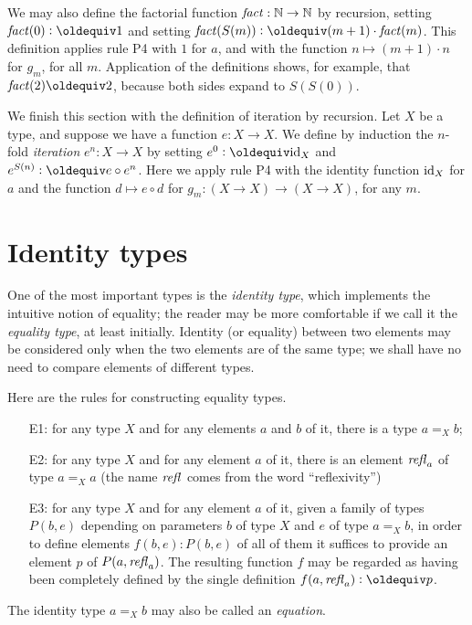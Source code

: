 We may also define the factorial function $\mathop{\mathit{fact}} : \mathbb{N} \to \mathbb{N}$ by recursion, setting $\fact(0) \defeq 1$ and setting
$\fact(S(m)) \defeq (m+1) \cdot \fact(m)$.  This definition applies rule P4 with $1$ for $a$, and with the
function $n \mapsto (m+1) \cdot n$ for $g_m$, for all $m$.
Application of the definitions shows, for example, that $\fact(2) \jdeq 2$, because both sides expand to $S(S(0))$.

We finish this section with the definition of iteration by recursion.  Let $X$ be a type, and suppose we have a function $e : X \to X$.  We
define by induction the $n$-fold \emph{iteration} $e^n : X \to X$ by setting $e^0 \defeq \id_X$ and $e^{S(n)}\defeq e\circ e^n$.
Here we apply rule P4 with the identity function $\mathord{\mathrm{id}}_X$ for $a$
and the function $d \mapsto e\circ d$ for $g_m : (X\to X)\to(X\to X)$, for any $m$.

\section{Identity types}
\label{sec:identity-types}

One of the most important types is the \emph{identity type}, which implements the intuitive notion of equality; the reader may be more
comfortable if we call it the \emph{equality type}, at least initially.  Identity (or equality) between two elements may be considered only when
the two elements are of the same type; we shall have no need to compare elements of different types.

Here are the rules for constructing equality types.
\begin{enumerate}
\item[E1:]
  for any type $X$ and for any elements $a$ and $b$ of it, there is a type $a =_X b$;
\item[E2:] for any type $X$ and for any element $a$ of it, there is an element $\mathop{{\it refl}_{a}}$ of type $a =_X a$ (the name $\mathop{{\it refl}_{}}$ comes from the word
  ``reflexivity'')
\item[E3:] for any type $X$ and for any element $a$ of it, given a family of types $P(b,e)$ depending on parameters $b$ of type $X$ and $e$ of type
  $a =_X b$, in order to define elements $f(b,e) : P(b,e)$ of all of them it suffices to provide an element $p$ of $P(a,\mathop{{\it refl}_{a}})$.  The resulting
  function $f$ may be regarded as having been completely defined by the single definition $f(a,\refl a) \defeq p$.
\end{enumerate}

The identity type $a =_X b$ may also be called an {\em equation}.

